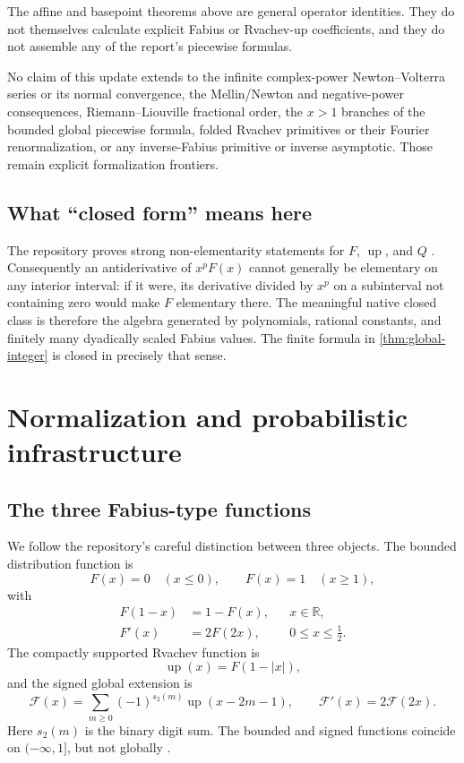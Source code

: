 \documentclass[11pt,oneside]{article}
\theoremstyle{definition}
\theoremstyle{remark}
\newcommand{\Fs}{\mathcal F}
\newcommand{\Up}{\operatorname{up}}
\newcommand{\R}{\mathbb R}
\newcommand{\1}{\mathbf 1}
\begin{document}
The affine and basepoint theorems above are general operator identities.  They
do not themselves calculate explicit Fabius or Rvachev-up coefficients, and
they do not assemble any of the report's piecewise formulas.

No claim of this update extends to the infinite complex-power
Newton--Volterra series or its normal convergence, the Mellin/Newton and
negative-power consequences, Riemann--Liouville fractional order, the
\(x>1\) branches of the bounded global piecewise formula, folded Rvachev
primitives or their Fourier renormalization, or any inverse-Fabius primitive
or inverse asymptotic.  Those remain explicit formalization frontiers.

\subsection{What ``closed form'' means here}
The repository proves strong non-elementarity statements for \(F\), \(\Up\),
and \(Q\) \cite{ProveItNonElementary,ProveItFrontiers}.  Consequently an
antiderivative of \(x^pF(x)\) cannot generally be elementary on any interior
interval: if it were, its derivative divided by \(x^p\) on a subinterval not
containing zero would make \(F\) elementary there.  The meaningful native
closed class is therefore the algebra generated by polynomials, rational
constants, and finitely many dyadically scaled Fabius values.  The finite
formula in \cref{thm:global-integer} is closed in precisely that sense.

\section{Normalization and probabilistic infrastructure}

\subsection{The three Fabius-type functions}
We follow the repository's careful distinction between three objects.  The
bounded distribution function is
\[
 F(x)=0\quad(x\leq0),\qquad F(x)=1\quad(x\geq1),
\]
with
\begin{align}
 F(1-x)&=1-F(x), &&x\in\R,                                      \label{eq:F-reflect}\\
 F'(x)&=2F(2x), &&0\leq x\leq\tfrac12.                           \label{eq:F-left-diff}
\end{align}
The compactly supported Rvachev function is
\begin{equation}
 \Up(x)=F(1-|x|),                                                \label{eq:up-def}
\end{equation}
and the signed global extension is
\begin{equation}
 \Fs(x)=\sum_{m\geq0}(-1)^{s_2(m)}\Up(x-2m-1),
 \qquad \Fs'(x)=2\Fs(2x).                                      \label{eq:signed-def}
\end{equation}
Here \(s_2(m)\) is the binary digit sum.  The bounded and signed functions
coincide on \(( -\infty,1]\), but not globally
\cite{ProveItPrimary,AriasArithmetic}.
\end{document}
